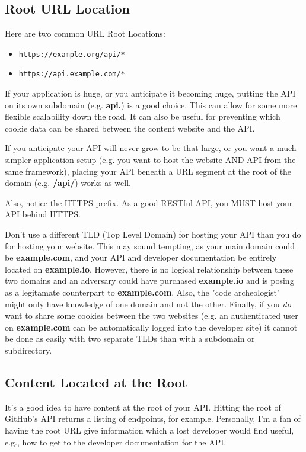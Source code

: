 \documentclass{book}
\begin{document}
\subsection{Root URL Location}

Here are two common URL Root Locations:

\begin{itemize}
\item \texttt{https://example.org/api/*}
\item \texttt{https://api.example.com/*}
\end{itemize}

If your application is huge, or you anticipate it becoming huge, putting the API on its own subdomain (e.g. \textbf{api.}) is a good choice. This can allow for some more flexible scalability down the road. It can also be useful for preventing which cookie data can be shared between the content website and the API.

If you anticipate your API will never grow to be that large, or you want a much simpler application setup (e.g. you want to host the website AND API from the same framework), placing your API beneath a URL segment at the root of the domain (e.g. \textbf{/api/}) works as well.

Also, notice the HTTPS prefix. As a good RESTful API, you MUST host your API behind HTTPS.

Don't use a different TLD (Top Level Domain) for hosting your API than you do for hosting your website. This may sound tempting, as your main domain could be \textbf{example.com}, and your API and developer documentation be entirely located on \textbf{example.io}. However, there is no logical relationship between these two domains and an adversary could have purchased \textbf{example.io} and is posing as a legitamate counterpart to \textbf{example.com}. Also, the "code archeologist" might only have knowledge of one domain and not the other. Finally, if you \emph{do} want to share some cookies between the two websites (e.g. an authenticated user on \textbf{example.com} can be automatically logged into the developer site) it cannot be done as easily with two separate TLDs than with a subdomain or subdirectory.

\subsection{Content Located at the Root}

It's a good idea to have content at the root of your API. Hitting the root of GitHub's API returns a listing of endpoints, for example. Personally, I'm a fan of having the root URL give information which a lost developer would find useful, e.g., how to get to the developer documentation for the API.
\end{document}
